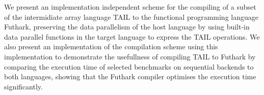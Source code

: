 \documentclass[11pt]{article}
\begin{document}

\clearpage\maketitle
\thispagestyle{empty}

\newpage

\abstract

We present an implementation independent scheme for the compiling of a subset of the intermidiate array language TAIL
 to the functional programming language Futhark, 
 preserving the data parallelism of the host language by using built-in data parallel functions in the target language to express the TAIL operations. We also present an implementation of the compilation scheme using this implementation to demonstrate the usefullness of compiling TAIL to Futhark by comparing the execution time of selected benchmarks on sequential backends to both languages, showing that the Futhark compiler optimises the execution time significantly. \\\\\\\\\\\\\\\\\\\\\\\\
\end{document}
